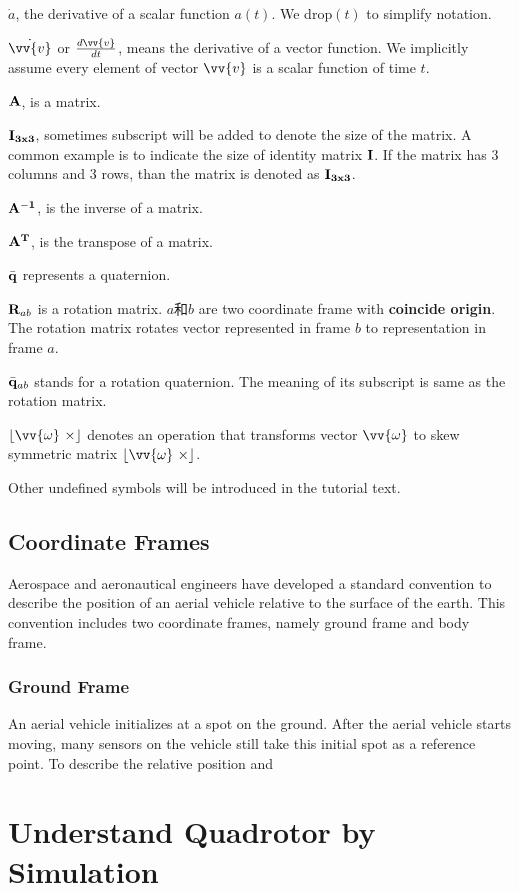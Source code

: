 \documentclass[11pt]{article}
\begin{document}
$\dot{a}$, the derivative of a scalar function $a(t)$. We drop$(t)$ to simplify notation.

$\dot{\vv{v}}$ or $\frac{d\vv{v}}{dt}$, means the derivative of a vector function. We implicitly assume every element of vector $\vv{v}$ is a scalar function of time $t$.

$\bf{A}$, is a matrix. 

$\bf{I}_{3x3}$, sometimes subscript will be added to denote the size of the matrix. A common example is to indicate the size of identity matrix $\bf{I}$. If the matrix has 3 columns and 3 rows, than the matrix is denoted as $\bf{I}_{3x3}$.

$\bf{A}^{-1}$, is the inverse of a matrix.

$\bf{A}^T$, is the transpose of a matrix.

$\bar{\bf{q}}$ represents a quaternion.

${\bf R}_{ab}$ is a rotation matrix. $a$和$b$ are two coordinate frame with \textbf{coincide origin}. The rotation matrix rotates vector represented in frame $b$ to representation in frame $a$.

$\bar{\bf{q}}_{ab}$ stands for a rotation quaternion. The meaning of its subscript is same as the rotation matrix.

$\lfloor \vv{\omega} \ \times \rfloor$ denotes an operation that transforms vector $\vv{\omega}$ to skew symmetric matrix $\lfloor \vv{\omega} \ \times \rfloor$.

Other undefined symbols will be introduced in the tutorial text.
\subsection{Coordinate Frames}
Aerospace and aeronautical engineers have developed a standard convention to describe the position of an aerial vehicle relative to the surface of the earth. This convention includes two coordinate frames, namely ground frame and body frame.
\subsubsection{Ground Frame}
An aerial vehicle initializes at a spot on the ground. After the aerial vehicle starts moving, many sensors on the vehicle still take this initial spot as a reference point. To describe the relative position and 

\section{Understand Quadrotor by Simulation}
\end{document}

